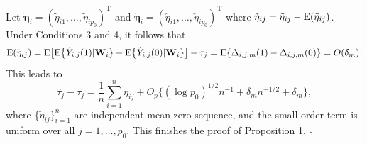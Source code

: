 \documentclass[12pt]{article}
\numberwithin{equation}{section}
\def\nn{\nonumber}
\def\T{{ \mathrm{\scriptscriptstyle T} }}
\newcommand{\E}{\rm E}
\newcommand{\bW}{{\mathbf W}}
\newcommand{\bfeta}  {\boldsymbol{\eta}}
\newcommand{\bXi}{\boldsymbol{\Xi}}
\begin{document}
Let $\tilde{\bfeta}_i = (\tilde{\eta}_{i1}, \ldots, \tilde{\eta}_{i p_0})^{\T}$ and $\check{\bfeta}_i = (\check{\eta}_{i1}, \ldots, \check{\eta}_{i p_0})^{\T}$ where $\check{\eta}_{ij} = \tilde{\eta}_{ij} - {\E}(\tilde{\eta}_{ij})$. %
Under Conditions 3 and 4, it follows that
$${\E}(\tilde{\eta}_{ij}) = {\E}\big[ {\E}\big\{\hat{Y}_{i,j}(1) | \bW_i\} - {\E}\big\{\hat{Y}_{i,j}(0) | \bW_i\} \big] - \tau_j = {\E}\{\Delta_{i, j, m}(1) - \Delta_{i, j, m}(0)\} =  O(\delta_m).$$
This leads to
$$\hat{\tau}_{j} - \tau_{j}
= 
\frac{1}{n}\sum_{i = 1}^{n} \check{\eta}_{ij}
+ 
O_{p}\{(\log p_0)^{1/2}n^{-1} + \delta_m n^{-1/2} + \delta_m\},$$
where $\{\check{\eta}_{ij}\}_{i = 1}^{n}$ are independent mean zero sequence, and the small order term is uniform over all $j = 1, \ldots, p_0$.
This finishes the proof of Proposition 1. $\square$
\end{document}
